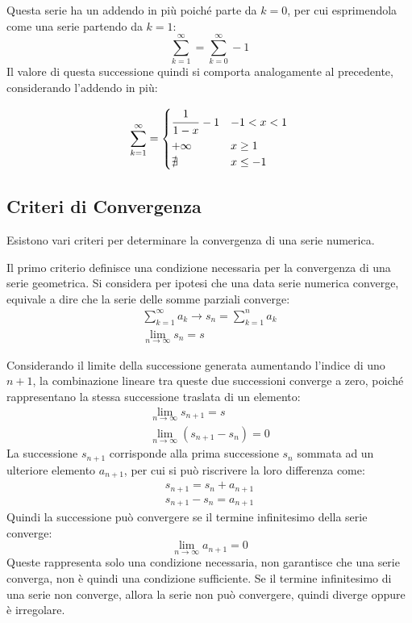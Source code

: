 \documentclass{article}
\numberwithin{equation}{subsection}
\begin{document}
Questa serie ha un addendo in più poiché parte da $k=0$, per cui esprimendola come una serie partendo da $k=1$:
\begin{equation*}
    \displaystyle\sum_{k=1}^\infty=\displaystyle\sum_{k=0}^\infty-1
\end{equation*}
Il valore di questa successione quindi si comporta analogamente al precedente, considerando l'addendo in più:

\begin{equation*}
    \displaystyle\sum_{k=1}^\infty=\begin{cases}
        \displaystyle\frac{\strut 1}{\strut 1-x}-1 &-1<x<1\\
        +\infty & x\geq1\\
        \nexists & x\leq-1
    \end{cases}
\end{equation*}

\subsection{Criteri di Convergenza}

Esistono vari criteri per determinare la convergenza di una serie numerica. 


Il primo criterio definisce una condizione necessaria per la convergenza di una serie geometrica. 
Si considera per ipotesi che una data serie numerica converge, equivale a dire che la serie delle somme parziali converge:
\begin{gather*}
    \displaystyle\sum_{k=1}^\infty a_k\rightarrow s_n=\sum_{k=1}^n a_k\\
    \lim_{n\to\infty}s_n=s
\end{gather*}

Considerando il limite della successione generata aumentando l'indice di uno $n+1$, la combinazione lineare tra queste due successioni converge a zero, poiché rappresentano la stessa successione traslata di un elemento:
\begin{gather*}
    \lim_{n\to\infty}s_{n+1}=s\\
    \lim_{n\to\infty}(s_{n+1}-s_n)=0
\end{gather*}
La successione $s_{n+1}$ corrisponde alla prima successione $s_n$ sommata ad un ulteriore elemento $a_{n+1}$, per cui si può riscrivere la loro differenza come:
\begin{gather*}
    s_{n+1}=s_n+a_{n+1}\\
    s_{n+1}-s_{n}=a_{n+1}
\end{gather*}
Quindi la successione può convergere se il termine infinitesimo della serie converge:
\begin{equation}
    \lim_{n\to\infty}a_{n+1}=0
\end{equation}
Queste rappresenta solo una condizione necessaria, non garantisce che una serie converga, non è quindi una condizione sufficiente. 
Se il termine infinitesimo di una serie non converge, allora la serie non può convergere, quindi diverge oppure è irregolare. 
\end{document}
